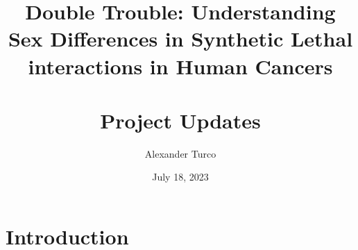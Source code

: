\documentclass{beamer}
\title[BEAP Dec 2022]{Double Trouble: Understanding Sex Differences in Synthetic Lethal interactions in Human Cancers \\~\\ Project Updates}
\author{Alexander Turco}
\date{July 18, 2023}
\begin{document}
	
	\section{Introduction}
	\begin{frame}
		\titlepage 
		\begin{center}
		\end{center}
	\end{frame}
	
	\logo{}
	
		
				

	
	
\end{document}
